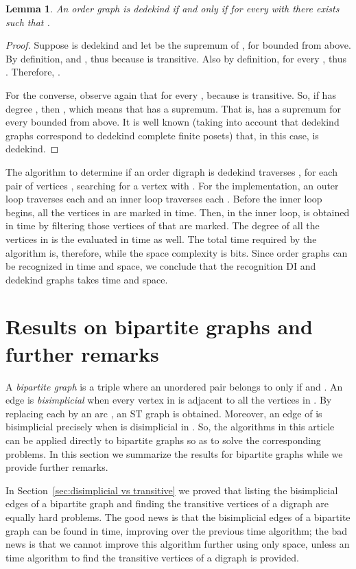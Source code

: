\documentclass[a4paper,11pt]{article}
\newtheorem{lemma}[theorem]{Lemma}
\begin{document}
\begin{lemma}
  An order graph  is dedekind if and only if for every  with  there exists  such that .
\end{lemma}

\begin{proof}
  Suppose  is dedekind and let  be the supremum of , for  bounded from above.  By definition,  and , thus  because  is transitive.  Also by definition,  for every , thus .  Therefore, .

  For the converse, observe again that  for every , because  is transitive.  So, if  has degree , then , which means that  has a supremum.  That is,  has a supremum for every  bounded from above.  It is well known (taking into account that dedekind graphs correspond to dedekind complete finite posets) that, in this case,  is dedekind.
\end{proof}

The algorithm to determine if an order digraph  is dedekind traverses , for each pair of vertices , searching for a vertex  with .  For the implementation, an outer loop traverses each  and an inner loop traverses each .  Before the inner loop begins, all the vertices in  are marked in  time.  Then, in the inner loop,  is obtained in  time by filtering those vertices of  that are marked.  The degree of all the vertices in  is the evaluated in  time as well.  The total time required by the algorithm is, therefore, 
while the space complexity is  bits.  Since order graphs can be recognized in  time and  space, we conclude that the recognition DI and dedekind graphs takes  time and  space.

\section{Results on bipartite graphs and further remarks}
\label{sec:further remarks}

A \emph{bipartite graph} is a triple  where an unordered pair  belongs to  only if  and .  An edge  is \emph{bisimplicial} when every vertex in  is adjacent to all the vertices in .  By replacing each  by an arc , an ST graph  is obtained.  Moreover, an edge  of  is bisimplicial precisely when  is disimplicial in .  So, the algorithms in this article can be applied directly to bipartite graphs so as to solve the corresponding problems.  In this section we summarize the results for bipartite graphs while we provide further remarks.

In Section~\ref{sec:disimplicial vs transitive} we proved that listing the bisimplicial edges of a bipartite graph and finding the transitive vertices of a digraph are equally hard problems.  The good news is that the bisimplicial edges of a bipartite graph can be found in  time, improving over the previous  time algorithm; the bad news is that we cannot improve this algorithm further using only  space, unless an  time algorithm to find the transitive vertices of a digraph is provided.  
\end{document}
